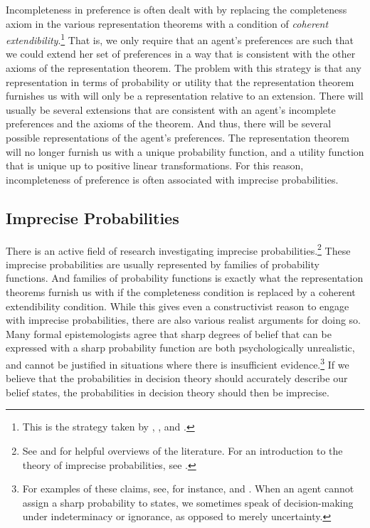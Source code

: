 Incompleteness in preference is often dealt with by replacing the completeness axiom in the various representation theorems with a condition of {\em coherent extendibility}.\footnote{This is the strategy taken by \citet{Kaplan1983}, \citet{Jeffrey1983}, and \citet{Joyce1999}.} That is, we only require that an agent's preferences are such that we could extend her set of preferences in a way that is consistent with the other axioms of the representation theorem. The problem with this strategy is that any representation in terms of probability or utility that the representation theorem furnishes us with will only be a representation relative to an extension. There will usually be several extensions that are consistent with an agent's incomplete preferences and the axioms of the theorem. And thus, there will be several possible representations of the agent's preferences. The representation theorem will no longer furnish us with a unique probability function, and a utility function that is unique up to positive linear transformations. For this reason, incompleteness of preference is often associated with imprecise probabilities.

\subsection{Imprecise Probabilities}\label{subs42}

There is an active field of research investigating imprecise probabilities.\footnote{See \citet{Bradley2015} and \citet{Mahtani2019} for helpful overviews of the literature. For an introduction to the theory of imprecise probabilities, see \citet{Augustin2014}.} These imprecise probabilities are usually represented by families of probability functions. And families of probability functions is exactly what the representation theorems furnish us with if the completeness condition is replaced by a coherent extendibility condition. While this gives even a constructivist reason to engage with imprecise probabilities, there are also various realist arguments for doing so. Many formal epistemologists agree that sharp degrees of belief that can be expressed with a sharp probability function are both psychologically unrealistic, and cannot be justified in situations where there is insufficient evidence.\footnote{For examples of these claims, see, for instance, \citet{Levi1980} and \citet{Kaplan1996}. When an agent cannot assign a sharp probability to states, we sometimes speak of decision-making under indeterminacy or ignorance, as opposed to merely uncertainty.} If we believe that the probabilities in decision theory should accurately describe our belief states, the probabilities in decision theory should then be imprecise.

